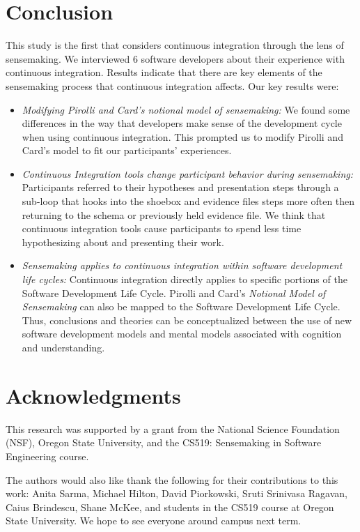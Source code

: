 \documentclass{sig-alternate}
\begin{document}
\section{Conclusion}
This study is the first that considers continuous integration through the lens of sensemaking. We interviewed 6 software developers about their experience with continuous integration. Results indicate that there are key elements of the sensemaking process that continuous integration affects. Our key results were:
\begin{itemize}  
	\item \textit{Modifying Pirolli and Card's notional model of sensemaking:} We found some differences in the way that developers make sense of the development cycle when using continuous integration. This prompted us to modify Pirolli and Card's model to fit our participants' experiences.
	\item \textit{Continuous Integration tools change participant behavior during sensemaking:} Participants referred to their hypotheses and presentation steps through a sub-loop that hooks into the shoebox and evidence files steps more often then returning to the schema or previously held evidence file. We think that continuous integration tools cause participants to spend less time hypothesizing about and presenting their work. 
	\item \textit{Sensemaking applies to continuous integration within software development life cycles:} Continuous integration directly applies to specific portions of the Software Development Life Cycle. Pirolli and Card's \textit{Notional Model of Sensemaking} can also be mapped to the Software Development Life Cycle. Thus, conclusions and theories can be conceptualized between the use of new software development models and mental models associated with cognition and understanding.
\end{itemize}

\section{Acknowledgments}
This research was supported by a grant from the National Science Foundation (NSF), Oregon State University, and the CS519: Sensemaking in Software Engineering course.

The authors would also like thank the following for their contributions to this work: Anita Sarma, Michael Hilton, David Piorkowski, Sruti Srinivasa Ragavan, Caius Brindescu, Shane McKee, and students in the CS519 course at Oregon State University. We hope to see everyone around campus next term.
%

%
%
\end{document}
